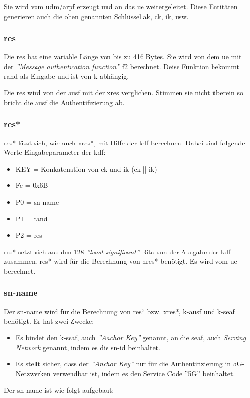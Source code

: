 Sie wird vom \gls{udm}/\gls{arpf} erzeugt und an das \gls{ue} weitergeleitet. Diese Entit\"aten generieren auch die oben genannten Schl\"ussel \gls{ak}, \gls{ck}, \gls{ik}, usw.

\subsubsection{\gls{res}}
Die \gls{res} hat eine variable L\"ange von bis zu 416 Bytes. %
Sie wird von dem \gls{ue} mit der \textit{''Message authentication function''} f2 berechnet.
Deise Funktion bekommt \gls{rand} als Eingabe und ist von \gls{k} abh\"angig. %

Die \gls{res} wird von der \gls{ausf} mit der \gls{xres} verglichen.
Stimmen sie nicht \"uberein so bricht die \gls{ausf} die Authentifizierung ab. %

\subsubsection{\gls{res*}}
\gls{res*} l\"asst sich, wie auch \gls{xres*}, mit Hilfe der \gls{kdf} berechnen.
Dabei sind folgende Werte Eingabeparameter der \gls{kdf}: %
\begin{itemize}
\item KEY = Konkatenation von \gls{ck} und \gls{ik} (\gls{ck} || \gls{ik})
\item Fc = 0x6B
\item P0 = \gls{sn-name}
\item P1 = \gls{rand}
\item P2 = \gls{res}
\end{itemize}

\gls{res*} setzt sich aus den 128 \textit{''least significant''} Bits von der Ausgabe der \gls{kdf} zusammen.
\gls{res*} wird f\"ur die Berechnung von \gls{hres*} ben\"otigt.
Es wird vom \gls{ue} berechnet.

\subsubsection{\gls{sn-name}}
Der \gls{sn-name} wird f\"ur die Berechnung von \gls{res*} bzw. \gls{xres*}, \gls{k-ausf} und \gls{k-seaf} ben\"otigt.
Er hat zwei Zwecke: %
\begin{itemize}
\item Es bindet den \gls{k-seaf}, auch  \textit{''Anchor Key''}  genannt, an die \gls{seaf}, auch \textit{Serving Network} genannt, indem es die \gls{sn-id} beinhaltet.
\item Es stellt sicher, dass der \textit{''Anchor Key''} nur f\"ur die Authentifizierung in 5G-Netzwerken verwendbar ist, indem es den Service Code ''5G'' beinhaltet.
\end{itemize}
Der \gls{sn-name} ist wie folgt aufgebaut: %

